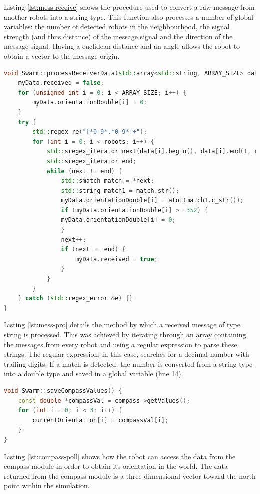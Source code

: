 Listing \ref{lst:mess-receive} shows the procedure used to convert a raw message from another robot, into a string type. This function also processes a number of global variables: the number of detected robots in the neighbourhood, the signal strength (and thus distance) of the message signal and the direction of the message signal. Having a euclidean distance and an angle allows the robot to obtain a vector to the message origin.

\clearpage

\begin{lstlisting}[language=C++, caption={Message processing},label={lst:mess-pro}]
void Swarm::processReceiverData(std::array<std::string, ARRAY_SIZE> data) {
	myData.received = false;
	for (unsigned int i = 0; i < ARRAY_SIZE; i++) {
		myData.orientationDouble[i] = 0;
	}
	try {
		std::regex re("[*0-9*.*0-9*]+");
		for (int i = 0; i < robots; i++) {
			std::sregex_iterator next(data[i].begin(), data[i].end(), re);
			std::sregex_iterator end;
			while (next != end) {
				std::smatch match = *next;
				std::string match1 = match.str();
				myData.orientationDouble[i] = atoi(match1.c_str());
				if (myData.orientationDouble[i] >= 352) {
				myData.orientationDouble[i] = 0;
				}
				next++;
				if (next == end) {
					myData.received = true;
				}
			}
		}
	} catch (std::regex_error &e) {}
}
\end{lstlisting}

Listing \ref{lst:mess-pro} details the method by which a received message of type string is processed. This was achieved by iterating through an array containing the messages from every robot and using a regular expression to parse these strings. The regular expression, in this case, searches for a decimal number with trailing digits. If a match is detected, the number is converted from a string type into a double type and saved in a global variable (line 14).

\clearpage

\begin{lstlisting}[language=C++, caption={Getting orientation data},label={lst:compass-poll}]
void Swarm::saveCompassValues() {
	const double *compassVal = compass->getValues();
	for (int i = 0; i < 3; i++) {
		currentOrientation[i] = compassVal[i];
	}
}
\end{lstlisting}

Listing \ref{lst:compass-poll} shows how the robot can access the data from the compass module in order to obtain its orientation in the world. The data returned from the compass module is a three dimensional vector toward the north point within the simulation.

